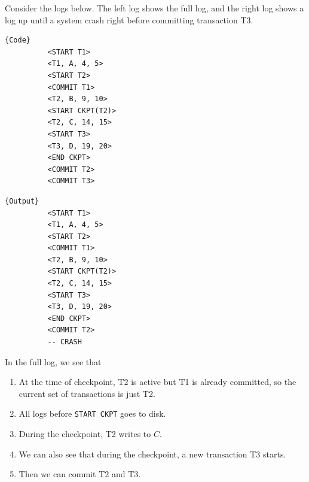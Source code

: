     \begin{example}
      \label{ex:crash-after-t2}
      Consider the logs below. The left log shows the full log, and the right log shows a log up until a system crash right before committing transaction T3. 
      
      \noindent\begin{minipage}{.5\textwidth}
        \begin{lstlisting}[]{Code}
          <START T1>
          <T1, A, 4, 5>
          <START T2>
          <COMMIT T1>
          <T2, B, 9, 10>
          <START CKPT(T2)>
          <T2, C, 14, 15>
          <START T3>
          <T3, D, 19, 20>
          <END CKPT>
          <COMMIT T2>
          <COMMIT T3>
        \end{lstlisting}
        \end{minipage}
        \hfill
        \begin{minipage}{.49\textwidth}
        \begin{lstlisting}[]{Output}
          <START T1>
          <T1, A, 4, 5>
          <START T2>
          <COMMIT T1>
          <T2, B, 9, 10>
          <START CKPT(T2)>
          <T2, C, 14, 15>
          <START T3>
          <T3, D, 19, 20>
          <END CKPT>
          <COMMIT T2>
          -- CRASH
        \end{lstlisting}
      \end{minipage}

      In the full log, we see that 
      \begin{enumerate}
        \item At the time of checkpoint, T2 is active but T1 is already committed, so the current set of transactions is just T2. 
        \item All logs before \texttt{START CKPT} goes to disk. 
        \item During the checkpoint, T2 writes to $C$. 
        \item We can also see that during the checkpoint, a new transaction T3 starts. 
        \item Then we can commit T2 and T3. 
      \end{enumerate}


\end{example}
